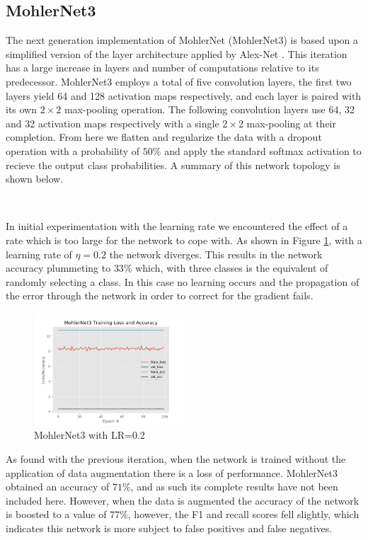 \documentclass[12pt]{article}
\begin{document}
\subsection{MohlerNet3}
The next generation implementation of MohlerNet (MohlerNet3) is based upon a simplified version of the layer architecture applied by Alex-Net \cite{NIPS2012_4824}. This iteration has a large increase in layers and number of computations relative to its predecessor. MohlerNet3 employs a total of five convolution layers, the first two layers yield 64 and 128 activation maps respectively, and each layer is paired with its own $2\times2$ max-pooling operation. The following convolution layers use 64, 32 and 32 activation maps respectively with a single $2\times2$ max-pooling at their completion. From here we flatten and regularize the data with a dropout operation with a probability of $50\%$ and apply the standard softmax activation to recieve the output class probabilities. A summary of this network topology is shown below. 
\begin{center}
	 \\
\end{center}
\newpage
In initial experimentation with the learning rate we encountered the effect of a rate which is too large for the network to cope with. As shown in Figure \ref{MN3Fail}, with a learning rate of $\eta = 0.2$ the network diverges. This results in the network accuracy plummeting to $33\%$ which, with three classes is the equivalent of randomly selecting a class. In this case no learning occurs and the propagation of the error through the network in order to correct for the gradient fails. 
\begin{figure}
	\centering %
	\includegraphics[width=0.5\textwidth]{MohlerNet3_opt-Divergent.png}
	\caption{MohlerNet3 with LR=0.2} \label{MN3Fail}
\end{figure}
As found with the previous iteration, when the network is trained without the application of data augmentation there is a loss of performance. MohlerNet3 obtained an accuracy of $71\%$, and as such its complete results have not been included here. However, when the data is augmented the accuracy of the network is boosted to a value of $77\%$, however, the F1 and recall scores fell slightly, which indicates this network is more subject to false positives and false negatives. 
\end{document}
